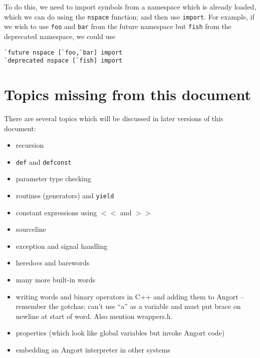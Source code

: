 To do this, we need to import symbols from a namespace which is already
loaded, which we can do using the \texttt{nspace} function; and then
use \texttt{import}. For example, if we wish to use \texttt{foo} and
\texttt{bar} from the future namespace but \texttt{fish} from the deprecated
namespace, we could use
\begin{lstlisting}
`future nspace [`foo,`bar] import
`deprecated nspace [`fish] import
\end{lstlisting}


\section{Topics missing from this document}
There are several topics which will be discussed in later versions
of this document:
\begin{itemize}
\item recursion
\item \texttt{def} and \texttt{defconst}
\item parameter type checking
\item routines (generators) and \texttt{yield}
\item constant expressions using $<<$ and $>>$
\item sourceline
\item exception and signal handling
\item heredocs and barewords
\item many more built-in words
\item writing words and binary operators in C++ and adding them to Angort --
remember the gotchas: can't use ``a'' as a variable and must put brace
on newline at start of word. Also mention wrappers.h.
\item properties (which look like global variables but invoke Angort code)
\item embedding an Angort interpreter in other systems
\end{itemize}




